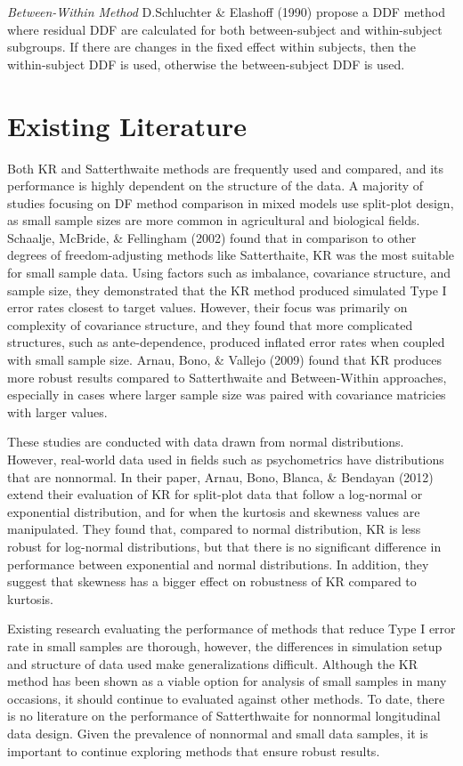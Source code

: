 \documentclass[12pt, twoside]{amherstthesis}
\begin{document}
\emph{Between-Within Method}
D.Schluchter \& Elashoff (1990) propose a DDF method where residual DDF are calculated for both between-subject and within-subject subgroups. If there are changes in the fixed effect within subjects, then the within-subject DDF is used, otherwise the between-subject DDF is used.

\hypertarget{existing-literature}{%
\section{Existing Literature}\label{existing-literature}}

Both KR and Satterthwaite methods are frequently used and compared, and its performance is highly dependent on the structure of the data.
A majority of studies focusing on DF method comparison in mixed models use split-plot design, as small sample sizes are more common in agricultural and biological fields. Schaalje, McBride, \& Fellingham (2002) found that in comparison to other degrees of freedom-adjusting methods like Satterthaite, KR was the most suitable for small sample data. Using factors such as imbalance, covariance structure, and sample size, they demonstrated that the KR method produced simulated Type I error rates closest to target values. However, their focus was primarily on complexity of covariance structure, and they found that more complicated structures, such as ante-dependence, produced inflated error rates when coupled with small sample size. Arnau, Bono, \& Vallejo (2009) found that KR produces more robust results compared to Satterthwaite and Between-Within approaches, especially in cases where larger sample size was paired with covariance matricies with larger values.

These studies are conducted with data drawn from normal distributions. However, real-world data used in fields such as psychometrics have distributions that are nonnormal. In their paper, Arnau, Bono, Blanca, \& Bendayan (2012) extend their evaluation of KR for split-plot data that follow a log-normal or exponential distribution, and for when the kurtosis and skewness values are manipulated. They found that, compared to normal distribution, KR is less robust for log-normal distributions, but that there is no significant difference in performance between exponential and normal distributions. In addition, they suggest that skewness has a bigger effect on robustness of KR compared to kurtosis.

Existing research evaluating the performance of methods that reduce Type I error rate in small samples are thorough, however, the differences in simulation setup and structure of data used make generalizations difficult. Although the KR method has been shown as a viable option for analysis of small samples in many occasions, it should continue to evaluated against other methods. To date, there is no literature on the performance of Satterthwaite for nonnormal longitudinal data design. Given the prevalence of nonnormal and small data samples, it is important to continue exploring methods that ensure robust results.
\end{document}

